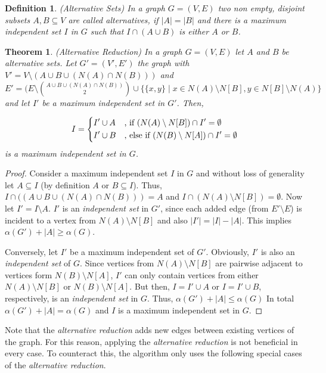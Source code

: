 \documentclass[12pt,a4paper,twoside]{scrartcl}
\newtheorem{theorem}{Theorem}
\newtheorem{definition}{Definition}
\numberwithin{equation}{section}
\begin{document}
\begin{definition} (Alternative Sets)
	In a graph $G=(V,E)$ two non empty, disjoint subsets $A,B\subseteq V$ are called alternatives, if $|A| = |B|$ and there is a maximum independent set $I$ in $G$ such that $I\cap(A\cup B)$ is either $A$ or $B$.
\end{definition}
\begin{theorem} (Alternative Reduction)
	In a graph $G=(V,E)$ let $A$ and $B$ be alternative sets. Let $G'=(V', E')$ the graph with $V' = V\setminus(A\cup B\cup (N(A)\cap N(B)))$ and $E' = (E\setminus\binom{A\cup B\cup (N(A)\cap N(B))}{2} \cup \{ \{x,y\}\;|\; x\in N(A)\setminus N[B], y\in N[B]\setminus N(A) \}$ and let $I'$ be a maximum independent set in $G'$. Then,
	
	\[I=\begin{dcases}
	I'\cup A & \text{, if } (N(A)\setminus N[B]) \cap I' = \emptyset%
	\\
	I'\cup B & \text{, else if } (N(B)\setminus N[A])\cap I' = \emptyset
	\end{dcases}\]
	is a maximum independent set in $G$.
\end{theorem}
\begin{proof}
	Consider a maximum independent set $I$ in $G$ and without loss of generality let $A\subseteq I$ (by definition $A$ or $B \subseteq I$). Thus, $I\cap ((A\cup B\cup (N(A)\cap N(B))) = A$ and $I\cap(N(A)\setminus N[B])=\emptyset$. Now let $I' = I\setminus A$. $I'$ is an \textit{independent set} in $G'$, since each added edge (from $E'\setminus E$) is incident to a vertex from $N(A)\setminus N[B]$ and also $|I'| = |I|-|A|$. This implies $\alpha(G')+|A| \geq \alpha(G)$.
	
	Conversely, let $I'$ be a maximum independent set of $G'$. Obviously, $I'$ is also an \textit{independent set} of $G$. Since vertices from $N(A)\setminus N[B]$ are pairwise adjacent to vertices form $N(B)\setminus N[A]$, $I'$ can only contain vertices from either $N(A)\setminus N[B]$ or $N(B)\setminus N[A]$. But then, $I=I'\cup A$ or $I=I'\cup B$, respectively, is an \textit{independent set} in $G$. Thus, $\alpha(G')+|A| \leq \alpha(G)$
	In total $\alpha(G')+|A| = \alpha(G)$ and $I$ is a maximum independent set in $G$.
\end{proof}
Note that the \textit{alternative reduction} adds new edges between existing vertices of the graph. For this reason, applying the \textit{alternative reduction} is not beneficial in every case. To counteract this, the algorithm only uses the following special cases of the \textit{alternative reduction}.
\end{document}
